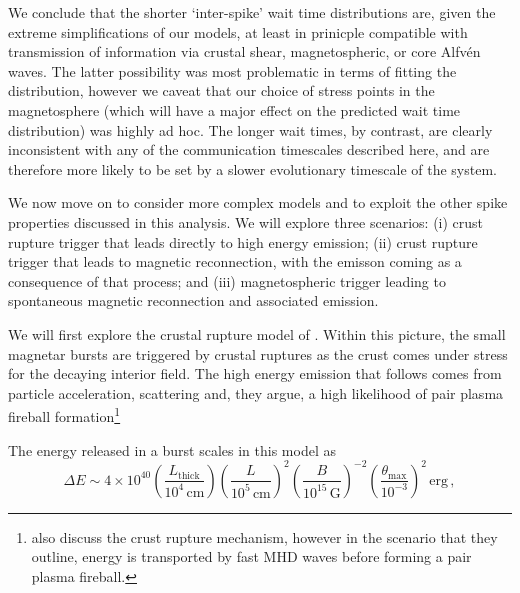 \documentclass[12pt]{emulateapj}
\begin{document}



We conclude that the shorter `inter-spike' wait time distributions are, given the extreme simplifications of our models, at least in prinicple compatible with transmission of information via crustal shear, magnetospheric, or core Alfv\'en waves.  The latter possibility was most problematic in terms of fitting the distribution, however we caveat that our choice of stress points in the magnetosphere (which will have a major effect on the predicted wait time distribution) was highly ad hoc.   The longer wait times, by contrast, are clearly inconsistent with any of the communication timescales described here, and are therefore more likely to be set by a slower evolutionary timescale of the system.  

We now move on to consider more complex models and to exploit the other spike properties discussed in this analysis. We will explore three scenarios: (i) crust rupture trigger that leads directly to high energy emission; (ii) crust rupture trigger that leads to magnetic reconnection, with the emisson coming as a consequence of that process; and (iii) magnetospheric trigger leading to spontaneous magnetic reconnection and associated emission.

We will first explore the crustal rupture model of \citet{thompson1995}. Within this picture, the small magnetar bursts are triggered by crustal ruptures as the crust comes under stress for the decaying interior field. The high energy emission that follows comes from particle acceleration, scattering and, they argue, a high likelihood of pair plasma fireball formation\footnote{\citet{heyl2005b} also discuss the crust rupture mechanism, however in the scenario that they outline, energy is transported by fast MHD waves before forming a pair plasma fireball.}

The energy released in a burst scales in this model \citep[Equation 28ff.\ in ][]{thompson1995} as 
\begin{equation}
\Delta E \sim 4\times 10^{40} \left(\frac{L_{\mathrm{thick}}}{10^{4}\,\mathrm{cm}} \right) \left( \frac{L}{10^{5}\,\mathrm{cm}}\right)^2 \left( \frac{B}{10^{15}\,\mathrm{G}}\right)^{-2} \left(\frac{\theta_\mathrm{max}}{10^{-3}}\right)^2 \, \mathrm{erg} \, ,
\end{equation}
\end{document}
